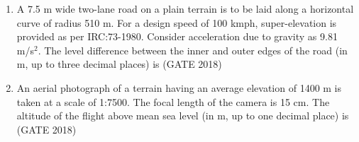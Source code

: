 \documentclass[journal,12pt,onecolumn]{IEEEtran}
\theoremstyle{remark}
\begin{document}
\begin{enumerate}
\item A 7.5 m wide two-lane road on a plain terrain is to be laid along a horizontal curve of radius 510 m. For a design speed of 100 kmph, super-elevation is provided as per IRC:73-1980. Consider acceleration due to gravity as 9.81 m/s$^2$. The level difference between the inner and outer edges of the road (in m, up to three decimal places) is \underline{\hspace{3cm}}
\hfill{(GATE 2018)}
\vspace{1cm}

\item An aerial photograph of a terrain having an average elevation of 1400 m is taken at a scale of 1:7500. The focal length of the camera is 15 cm. The altitude of the flight above mean sea level (in m, up to one decimal place) is \underline{\hspace{3cm}}
\hfill{(GATE 2018)}
\vspace{1cm}












   
\end{enumerate}
\end{document}
